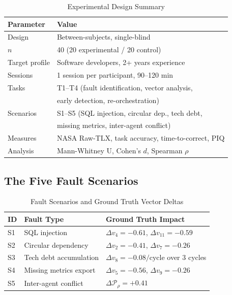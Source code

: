 \documentclass[manuscript,review,anonymous]{acmart}
\begin{document}
\begin{table}[t]
  \caption{Experimental Design Summary}
  \label{tab:design}
  \begin{tabular}{ll}
    \toprule
    Parameter & Value \\
    \midrule
    Design & Between-subjects, single-blind \\
    $n$ & 40 (20 experimental / 20 control) \\
    Target profile & Software developers, 2+ years experience \\
    Sessions & 1 session per participant, 90--120 min \\
    Tasks & T1--T4 (fault identification, vector analysis, \\
           & early detection, re-orchestration) \\
    Scenarios & S1--S5 (SQL injection, circular dep., tech debt, \\
              & missing metrics, inter-agent conflict) \\
    Measures & NASA Raw-TLX, task accuracy, time-to-correct, PIQ \\
    Analysis & Mann-Whitney U, Cohen's $d$, Spearman $\rho$ \\
    \bottomrule
  \end{tabular}
\end{table}

\subsection{The Five Fault Scenarios}

\begin{table}[t]
  \caption{Fault Scenarios and Ground Truth Vector Deltas}
  \label{tab:scenarios}
  \begin{tabular}{p{0.5cm}p{2.5cm}p{4.5cm}}
    \toprule
    ID & Fault Type & Ground Truth Impact \\
    \midrule
    S1 & SQL injection & $\Delta v_4 = -0.61$, $\Delta v_{11} = -0.59$ \\
    S2 & Circular dependency & $\Delta v_2 = -0.41$, $\Delta v_7 = -0.26$ \\
    S3 & Tech debt accumulation & $\Delta v_8 = -0.08/\text{cycle}$ over 3 cycles \\
    S4 & Missing metrics export & $\Delta v_5 = -0.56$, $\Delta v_9 = -0.26$ \\
    S5 & Inter-agent conflict & $\Delta \mathcal{P}_\rho = +0.41$ \\
    \bottomrule
  \end{tabular}
\end{table}
\end{document}
